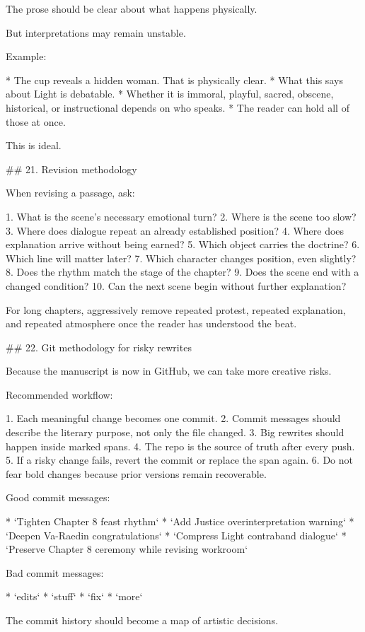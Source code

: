The prose should be clear about what happens physically.

But interpretations may remain unstable.

Example:

* The cup reveals a hidden woman. That is physically clear.
* What this says about Light is debatable.
* Whether it is immoral, playful, sacred, obscene, historical, or instructional depends on who speaks.
* The reader can hold all of those at once.

This is ideal.

## 21. Revision methodology

When revising a passage, ask:

1. What is the scene’s necessary emotional turn?
2. Where is the scene too slow?
3. Where does dialogue repeat an already established position?
4. Where does explanation arrive without being earned?
5. Which object carries the doctrine?
6. Which line will matter later?
7. Which character changes position, even slightly?
8. Does the rhythm match the stage of the chapter?
9. Does the scene end with a changed condition?
10. Can the next scene begin without further explanation?

For long chapters, aggressively remove repeated protest, repeated explanation, and repeated atmosphere once the reader has understood the beat.

## 22. Git methodology for risky rewrites

Because the manuscript is now in GitHub, we can take more creative risks.

Recommended workflow:

1. Each meaningful change becomes one commit.
2. Commit messages should describe the literary purpose, not only the file changed.
3. Big rewrites should happen inside marked spans.
4. The repo is the source of truth after every push.
5. If a risky change fails, revert the commit or replace the span again.
6. Do not fear bold changes because prior versions remain recoverable.

Good commit messages:

* `Tighten Chapter 8 feast rhythm`
* `Add Justice overinterpretation warning`
* `Deepen Va-Raedin congratulations`
* `Compress Light contraband dialogue`
* `Preserve Chapter 8 ceremony while revising workroom`

Bad commit messages:

* `edits`
* `stuff`
* `fix`
* `more`

The commit history should become a map of artistic decisions.

